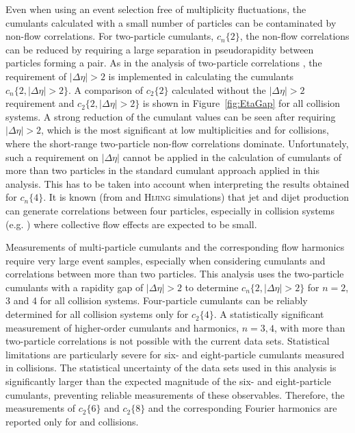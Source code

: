 \documentclass[cernpreprint,texlive=2014,txfonts,UKenglish]{latex/atlasdoc}
\begin{document}
Even when using an event selection free of multiplicity fluctuations, the cumulants calculated with a small number of particles can be contaminated by non-flow correlations. For two-particle cumulants, $c_n\{2\}$, the non-flow correlations can be reduced by requiring a large separation in pseudorapidity between particles forming a pair. As in the analysis of two-particle correlations \cite{pPbatlas1,pPbatlas3,ppatlas1,ppatlas2}, the requirement of $|\Delta\eta|>2$ is implemented in calculating the cumulants $c_n\{2,|\Delta\eta|>2\}$. A comparison of $c_2\{2\}$ calculated without the $|\Delta\eta|>2$  requirement and $c_2\{2,|\Delta\eta|>2\}$ is shown in Figure~\ref{fig:EtaGap} for all collision systems. A strong reduction of the cumulant values can be seen after requiring $|\Delta\eta|>2$, which is the most significant at low multiplicities and for \pp collisions, where the short-range two-particle non-flow correlations dominate.  Unfortunately, such a requirement on $|\Delta\eta|$ cannot be applied in the calculation of cumulants of more than two particles in the standard cumulant approach applied in this analysis. This has to be taken into account when interpreting the results obtained for $c_n\{4\}$. It is known (from  \PYTHIA \cite{jia} and \textsc{Hijing} simulations) that jet and dijet production can generate correlations between four particles, especially in collision systems (e.g. \pp) where collective flow effects are  expected to be small.

Measurements of multi-particle cumulants and the corresponding flow harmonics require very large event samples, especially when considering cumulants and correlations between more than two particles. This analysis uses the two-particle cumulants with a rapidity gap of $|\Delta\eta|>2$ to determine $c_n\{2,|\Delta\eta|>2\}$ for $n= 2$, 3 and 4 for all collision systems.
Four-particle cumulants can be reliably determined for all collision systems only for  $c_2\{4\}$. A statistically significant measurement of higher-order cumulants and harmonics, $n=3,4$, with more than two-particle correlations is not possible with the current data sets.
Statistical limitations are particularly severe for six- and eight-particle cumulants measured in \pp collisions. The statistical uncertainty of the \pp data sets used in this analysis is significantly larger than the expected magnitude of the six- and eight-particle cumulants, preventing reliable measurements of these observables. Therefore, the measurements of $c_2\{6\}$ and $c_2\{8\}$ and the corresponding Fourier harmonics are reported only for \pPb and \PbPb collisions. 
\end{document}
